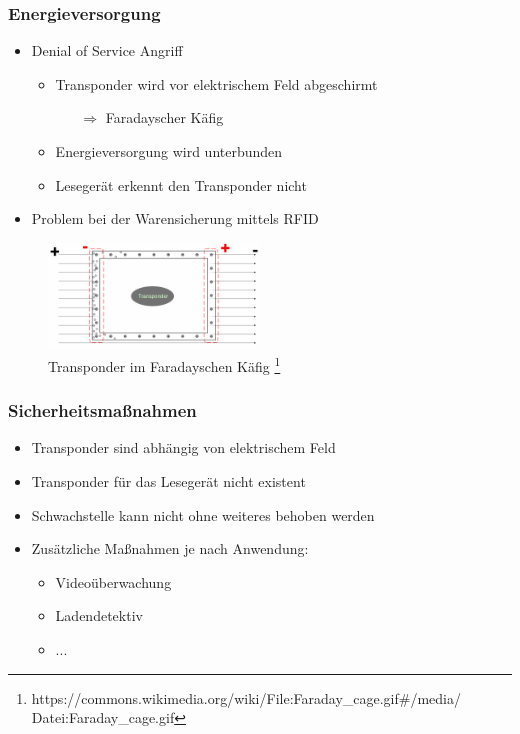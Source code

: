 \documentclass{beamer}
\begin{document}
\begin{frame}
\frametitle{Energieversorgung}

\begin{itemize}
	\item Denial of Service Angriff
	\begin{itemize}
		\item Transponder wird vor elektrischem Feld abgeschirmt
		\begin{itemize}
			\item[$\Rightarrow$] Faradayscher Käfig
		\end{itemize}
		\item Energieversorgung wird unterbunden 
		\item Lesegerät erkennt den Transponder nicht
	\end{itemize}
	
	\item Problem bei der Warensicherung mittels RFID
\end{itemize}

\begin{figure}
\includegraphics[width=0.5\textwidth]{img/kaefig.png}
\caption{Transponder im Faradayschen Käfig \footnote{https://commons.wikimedia.org/wiki/File:Faraday\_cage.gif\#/media/ Datei:Faraday\_cage.gif}}
\end{figure}
\end{frame}


\begin{frame}
\frametitle{Sicherheitsmaßnahmen}

\begin{itemize}
	\item Transponder sind abhängig von elektrischem Feld
	\item Transponder für das Lesegerät nicht existent
	\item Schwachstelle kann nicht ohne weiteres behoben werden
	\item Zusätzliche Maßnahmen je nach Anwendung:
	\begin{itemize}
		\item Videoüberwachung
		\item Ladendetektiv
		\item ...
	\end{itemize}
\end{itemize}
\end{frame}
\end{document}

